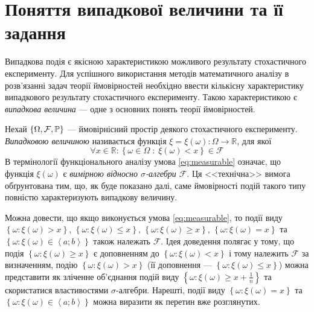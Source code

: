 
\section{Поняття випадкової величини та її задання}
Випадкова подія є якісною характеристикою можливого результату стохастичного експерименту.
Для успішного використання методів математичного аналізу в розв'язанні задач теорії ймовірностей
необхідно ввести кількісну характеристику випадкового результату стохастичного експерименту.
Такою характеристикою є \emph{випадкова величина} --- одне з основних понять теорії ймовірностей.
\begin{definition}
    Нехай $\left\{\Omega, \mathcal{F}, \P \right\}$ --- ймовірнісний простір деякого стохастичного експерименту.
    \emph{Випадковою величиною} називається функція $\xi = \xi(\omega): \Omega 
    \rightarrow \mathbb{R}$, для якої 
    \begin{equation}\label{eq:measurable}
        \forall x \in \mathbb{R}:
        \left\{ \omega \in \Omega\; :\; \xi(\omega) < x\right\} \in \mathcal{F}
    \end{equation} 
    В термінології функціонального аналізу умова \eqref{eq:measurable} означає, що функція $\xi(\omega)$ є
    \emph{вимірною відносно $\sigma$-алгебри $\mathcal{F}$}. Ця <<технічна>> вимога обґрунтована тим,
    що, як буде показано далі, саме ймовірності подій такого типу повністю характеризують випадкову величину.
\end{definition}
\begin{remark}
    Можна довести, що якщо виконується умова \eqref{eq:measurable}, то події виду
    $\left\{ \omega: \xi(\omega) > x\right\}$, $\left\{ \omega: \xi(\omega) \leq x\right\}$,
    $\left\{ \omega: \xi(\omega) \geq x\right\}$, $\left\{ \omega: \xi(\omega) = x\right\}$ та
    $\left\{ \omega: \xi(\omega) \in \left< a; b\right> \right\}$ також належать $\mathcal{F}$.
    Ідея доведення полягає у тому, що подія $\left\{ \omega: \xi(\omega) \geq x\right\}$ є
    доповненням до $\left\{ \omega: \xi(\omega) < x\right\}$ і тому належить $\mathcal{F}$
    за визначенням, подію $\left\{ \omega: \xi(\omega) > x\right\}$ (її доповнення --- 
    $\left\{ \omega: \xi(\omega) \leq x\right\}$) можна представити
    як зліченне об'єднання подій виду $\left\{ \omega: \xi(\omega) \geq x + \frac{1}{n}\right\}$
    та скористатися властивостями $\sigma$-алгебри.
    Нарешті, події виду $\left\{ \omega: \xi(\omega) = x\right\}$ та
    $\left\{ \omega: \xi(\omega) \in \left< a; b\right> \right\}$
    можна виразити як перетин вже розглянутих.
\end{remark}

